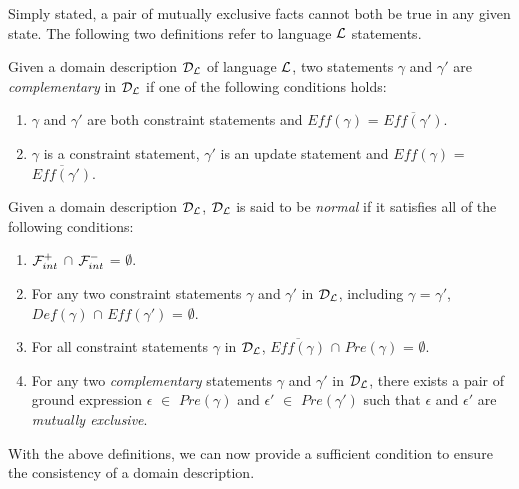\documentclass[global,twocolumn,final]{svjour}
\newenvironment{vdefinition}
  {\begin{definition}\hspace{0.25em}}
  {\end{definition}}
\begin{document}
    Simply stated, a pair of mutually exclusive facts cannot both be true
    in any given state. The following two definitions refer to language
    ${\cal L}$ statements.

    \begin{vdefinition}
      \label{def-comp}
      Given a domain description ${\cal D_{L}}$ of language ${\cal L}$,
      two statements $\gamma$ and $\gamma'$ are {\em complementary} in
      ${\cal D_{L}}$ if one of the following conditions holds:
      \begin{enumerate}
        \item
          $\gamma$ and $\gamma'$ are both constraint statements and
          $Eff(\gamma)$ = $\overline{Eff(\gamma')}$.
        \item
          $\gamma$ is a constraint statement, $\gamma'$ is an update
          statement and $Eff(\gamma)$ = $\overline{Eff(\gamma')}$.
      \end{enumerate}
    \end{vdefinition}

    \begin{vdefinition}
      \label{def-norm}
      Given a domain description ${\cal D_{L}}$, ${\cal D_{L}}$ is said to
      be {\em normal} if it satisfies all of the following conditions:
      \begin{enumerate}
        \item
          \label{def-norm-1}
          ${\cal F}^{+}_{int}$ $\cap$ ${\cal F}^{-}_{int}$ = $\emptyset$.
        \item
          \label{def-norm-2}
          For any two constraint statements $\gamma$ and $\gamma'$ in
          ${\cal D_{L}}$, including $\gamma$ = $\gamma'$, $Def(\gamma)$ $\cap$
          $Eff(\gamma')$ = $\emptyset$.
        \item
          \label{def-norm-3}
          For all constraint statements $\gamma$ in ${\cal D_{L}}$,
          $\overline{Eff(\gamma)}$ $\cap$ $Pre(\gamma)$ = $\emptyset$.
        \item
          \label{def-norm-4}
          For any two {\em complementary} statements $\gamma$ and $\gamma'$ in
          ${\cal D_{L}}$, there exists a pair of ground expression $\epsilon$
          $\in$ $Pre(\gamma)$ and $\epsilon'$ $\in$ $Pre(\gamma')$ such that
          $\epsilon$ and $\epsilon'$ are {\em mutually exclusive}.
      \end{enumerate}
    \end{vdefinition}

    With the above definitions, we can now provide a sufficient condition to
    ensure the consistency of a domain description.
\end{document}
